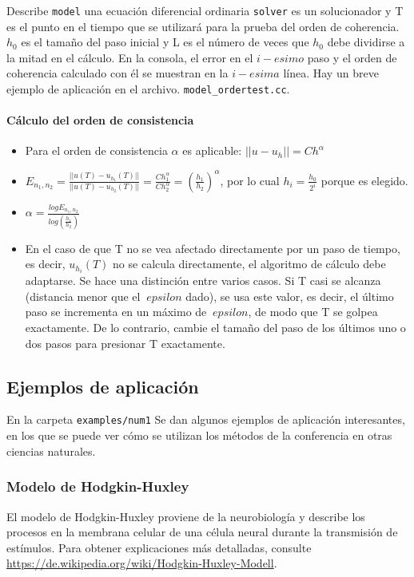 Describe \lstinline{model} una ecuación diferencial
ordinaria \lstinline{solver} es un solucionador y T es el punto en el tiempo que se utilizará 
para la prueba del orden de coherencia. $ h_0 $ es el tamaño del paso inicial y L es el número 
de veces que $ h_0 $ debe dividirse a la mitad en el cálculo. En la consola, el error en el $i-esimo$ 
paso y el orden de coherencia calculado con él se muestran en la $i-esima$ línea. 
Hay un breve ejemplo de aplicación en el archivo. 
\lstinline{model_ordertest.cc}.

\paragraph{Cálculo del orden de consistencia}
\begin{itemize}
\item Para el orden de consistencia $\alpha$ es aplicable: $||u-u_h||=Ch^\alpha$
\item
  $E_{n_1,n_2}= \frac{||u(T)-u_{h_1}(T)||}{||u(T)-u_{h_2}(T)||} =
  \frac{Ch_1^\alpha}{Ch_2^\alpha}=
  \left(\frac{h_1}{h_2}\right)^\alpha$, por lo cual $h_i=\frac{h_0}{2^i}$
  porque es elegido.
\item
  $\alpha= \frac{log E_{n_1,n_2}}{log \left( \frac{h_1}{h_2} \right)}$
\item En el caso de que T no se vea afectado directamente por un paso de tiempo, es decir, $ u_ {h_i} (T) $ no se calcula directamente, el algoritmo de cálculo debe adaptarse. Se hace una distinción entre varios casos. Si T casi se alcanza 
(distancia menor que el $ \ epsilon $ dado), se usa este valor, es decir, el último paso se incrementa en un 
máximo de $ \ epsilon $, de modo que T se golpea exactamente. De lo contrario, cambie el tamaño del paso de 
los últimos uno o dos pasos para presionar T exactamente.
\end{itemize}



\subsection{Ejemplos de aplicación}
En la carpeta \lstinline{examples/num1} Se dan algunos ejemplos de aplicación interesantes, en los que se puede ver cómo se utilizan los métodos de la conferencia en otras ciencias naturales.

\subsubsection{Modelo de Hodgkin-Huxley}
El modelo de Hodgkin-Huxley proviene de la neurobiología y describe los procesos en la membrana celular de una célula neural durante la transmisión de estímulos. Para obtener explicaciones más detalladas, consulte \url{https://de.wikipedia.org/wiki/Hodgkin-Huxley-Modell}.

